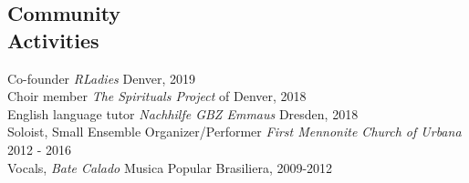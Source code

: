 \documentclass[margin, 10pt]{CVStyleTemplate}\usepackage[]{graphicx}\usepackage[]{color}
\begin{document}
\begin{resume}
%








\section{Community \\ Activities}

Co-founder \emph{RLadies} Denver, 2019 \\
Choir member \emph{The Spirituals Project} of Denver, 2018 \\
English language tutor \emph{Nachhilfe GBZ Emmaus} Dresden, 2018 \\
Soloist, Small Ensemble Organizer/Performer \emph{First Mennonite Church of Urbana} 2012 - 2016\\
Vocals, \emph{Bate Calado} Musica Popular Brasiliera, 2009-2012\\


\end{resume}
\end{document}
